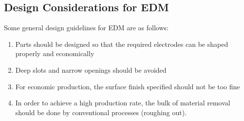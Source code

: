 \subsection{Design Considerations for EDM}
Some general design guidelines for EDM are as follows:
\begin{enumerate}
	\item Parts should be designed so that the required electrodes can be shaped properly and economically
	\item Deep slots and narrow openings should be avoided
	\item For economic production, the surface finish specified should not be too fine
	\item In order to achieve a high production rate, the bulk of material removal should be done by conventional processes (roughing out).
\end{enumerate}
